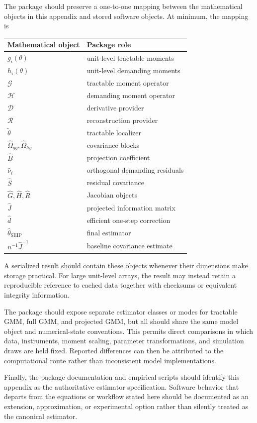 The package should preserve a one-to-one mapping between the mathematical
objects in this appendix and stored software objects. At minimum, the mapping is
\begin{center}
\begin{tabular}{ll}
\hline
Mathematical object & Package role \\
\hline
$g_i(\theta)$ & unit-level tractable moments \\
$h_i(\theta)$ & unit-level demanding moments \\
$\mathcal G$ & tractable moment operator \\
$\mathcal H$ & demanding moment operator \\
$\mathcal D$ & derivative provider \\
$\mathcal R$ & reconstruction provider \\
$\widetilde\theta$ & tractable localizer \\
$\widehat\Omega_{gg},\widehat\Omega_{hg}$ & covariance blocks \\
$\widehat B$ & projection coefficient \\
$\widehat\nu_i$ & orthogonal demanding residuals \\
$\widehat S$ & residual covariance \\
$\widehat G,\widehat H,\widehat R$ & Jacobian objects \\
$\widehat J$ & projected information matrix \\
$\widehat d$ & efficient one-step correction \\
$\widehat\theta_{\mathrm{SEIP}}$ & final estimator \\
$n^{-1}\widehat J^{-1}$ & baseline covariance estimate \\
\hline
\end{tabular}
\end{center}

A serialized result should contain these objects whenever their dimensions make
storage practical. For large unit-level arrays, the result may instead retain a
reproducible reference to cached data together with checksums or equivalent
integrity information.

The package should expose separate estimator classes or modes for tractable GMM,
full GMM, and projected GMM, but all should share the same model object and
numerical-state conventions. This permits direct comparisons in which data,
instruments, moment scaling, parameter transformations, and simulation draws are
held fixed. Reported differences can then be attributed to the computational
route rather than inconsistent model implementations.

Finally, the package documentation and empirical scripts should identify this
appendix as the authoritative estimator specification. Software behavior that
departs from the equations or workflow stated here should be documented as an
extension, approximation, or experimental option rather than silently treated
as the canonical estimator.
